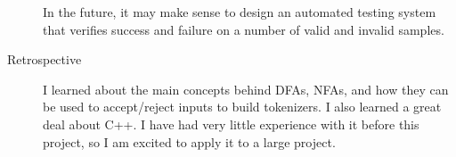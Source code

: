 \documentclass[12pt,letterpaper]{article}
\begin{document}
\begin{description}
  In the future, it may make sense to design an automated testing system that
  verifies success and failure on a number of valid and invalid samples.

\item[Retrospective] I learned about the main concepts behind DFAs, NFAs, and
  how they can be used to accept/reject inputs to build tokenizers. I also
  learned a great deal about C++. I have had very little experience with it
  before this project, so I am excited to apply it to a large project.

\end{description}
\end{document}

